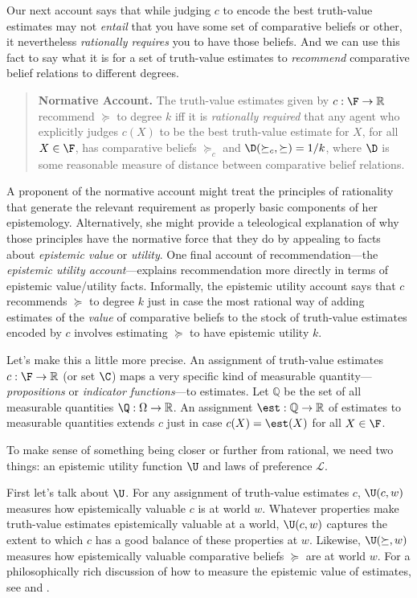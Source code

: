 Our next account says that while judging $c$ to encode the best truth-value estimates may not \textit{entail} that you have some set of comparative beliefs or other, it nevertheless \textit{rationally requires} you to have those beliefs. And we can use this fact to say what it is for a set of truth-value estimates to \textit{recommend} comparative belief relations to different degrees.
\begin{quote}
\textbf{Normative Account.} The truth-value estimates given by $c:\F\rightarrow\mathbb{R}$ recommend $\succeq$ to degree $k$ iff it is \textit{rationally required} that any agent who explicitly judges $c(X)$ to be the best truth-value estimate for $X$, for all $X\in\F$, has comparative beliefs $\succeq_c$ and $\D(\succeq_c,\succeq)=1/k$, where $\D$ is some reasonable measure of distance between comparative belief relations. 
\end{quote}

A proponent of the normative account might treat the principles of rationality that generate the relevant requirement as properly basic components of her epistemology. Alternatively, she might provide a teleological explanation of why those principles have the normative force that they do by appealing to facts about \textit{epistemic value} or \textit{utility}. One final account of recommendation---the \textit{epistemic utility account}---explains recommendation more directly in terms of epistemic value/utility facts. Informally, the epistemic utility account says that $c$ recommends $\succeq$ to degree $k$ just in case the most rational way of adding estimates of the \textit{value} of comparative beliefs to the stock of truth-value estimates encoded by $c$ involves estimating $\succeq$ to have epistemic utility $k$.

Let's make this a little more precise. An assignment of truth-value estimates $c:\F\rightarrow\mathbb{R}$ (or set $\C$) maps a very specific kind of measurable quantity---\textit{propositions} or \textit{indicator functions}---to estimates. Let $\mathbb{Q}$ be the set of all measurable quantities $\Q:\Omega\rightarrow\mathbb{R}$. An assignment $\est:\mathbb{Q}\rightarrow\mathbb{R}$ of estimates to measurable quantities extends $c$ just in case $c(X)=\est(X)$ for all $X\in\F$.

To make sense of something being closer or further from rational, we need two things: an epistemic utility function $\U$ and laws of preference $\mathcal{L}$.

First let's talk about $\U$. For any assignment of truth-value estimates $c$, $\U(c,w)$ measures how epistemically valuable $c$ is at world $w$. Whatever properties make truth-value estimates epistemically valuable at a world, $\U(c,w)$ captures the extent to which $c$ has a good balance of these properties at $w$. Likewise, $\U(\succeq,w)$ measures how epistemically valuable comparative beliefs $\succeq$ are at world $w$. For a philosophically rich discussion of how to measure the epistemic value of estimates, see \citet{Joyce2009} and \citet{Pettigrew2016}.

